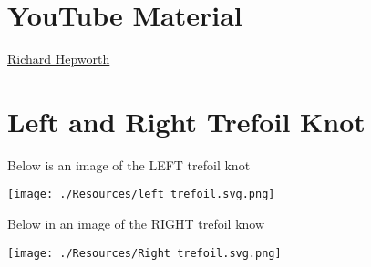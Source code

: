 \documentclass[12pt, a4paper]{article}
\begin{document}
\section{YouTube Material}

\href{https://youtube.com/@richardhepworth1441?si=FlN-NyqyRQ6juq87}{Richard Hepworth}

\section{Left and Right Trefoil Knot}

Below is an image of the LEFT trefoil knot 

\begin{center}
    \texttt{[image: ./Resources/left trefoil.svg.png]}
\end{center}

Below in an image of the RIGHT trefoil know 

\begin{center}
    \texttt{[image: ./Resources/Right trefoil.svg.png]}
\end{center}
\end{document}
